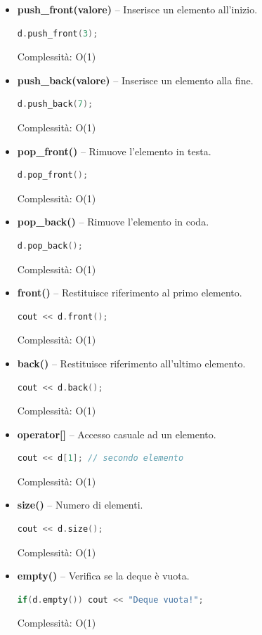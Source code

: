 \begin{itemize}
	\item \textbf{push\_front(valore)} – Inserisce un elemento all’inizio.
	\begin{lstlisting}[language=C++]
		d.push_front(3);
	\end{lstlisting}
	Complessità: O(1)
	
	\item \textbf{push\_back(valore)} – Inserisce un elemento alla fine.
	\begin{lstlisting}[language=C++]
		d.push_back(7);
	\end{lstlisting}
	Complessità: O(1)
	
	\item \textbf{pop\_front()} – Rimuove l’elemento in testa.
	\begin{lstlisting}[language=C++]
		d.pop_front();
	\end{lstlisting}
	Complessità: O(1)
	
	\item \textbf{pop\_back()} – Rimuove l’elemento in coda.
	\begin{lstlisting}[language=C++]
		d.pop_back();
	\end{lstlisting}
	Complessità: O(1)
	
	\item \textbf{front()} – Restituisce riferimento al primo elemento.
	\begin{lstlisting}[language=C++]
		cout << d.front();
	\end{lstlisting}
	Complessità: O(1)
	
	\item \textbf{back()} – Restituisce riferimento all’ultimo elemento.
	\begin{lstlisting}[language=C++]
		cout << d.back();
	\end{lstlisting}
	Complessità: O(1)
	
	\item \textbf{operator[]} – Accesso casuale ad un elemento.
	\begin{lstlisting}[language=C++]
		cout << d[1]; // secondo elemento
	\end{lstlisting}
	Complessità: O(1)
	
	\item \textbf{size()} – Numero di elementi.
	\begin{lstlisting}[language=C++]
		cout << d.size();
	\end{lstlisting}
	Complessità: O(1)
	
	\item \textbf{empty()} – Verifica se la deque è vuota.
	\begin{lstlisting}[language=C++]
		if(d.empty()) cout << "Deque vuota!";
	\end{lstlisting}
	Complessità: O(1)
\end{itemize}

